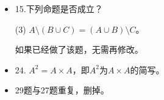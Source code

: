 \documentclass{article}
\begin{document}
\begin{CJK}{UTF8}{gbsn}
  \newtheorem*{Ex}{习题}

  \begin{itemize}
  \item
    15.下列命题是否成立？

(3) $A\setminus (B\cup C) = (A\cup B)\setminus C$。

如果已经做了该题，无需再修改。

\item
24. $A^2=A\times A$，即$A^2$为$A\times A$的简写。

\item

29题与27题重复，删掉。
  \end{itemize}
\end{CJK}
\end{document}
